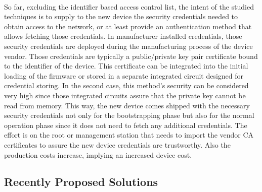\paragraph{}
So far, excluding the identifier based access control list, the intent of the studied techniques is to supply to the new device the security credentials needed to obtain access to the network, or at least provide an authentication method that allows fetching those credentials. In manufacturer installed credentials, those security credentials are deployed during the manufacturing process of the device vendor. Those credentials are typically a public/private key pair certificate bound to the identifier of the device. This certificate can be integrated into the initial loading of the firmware or stored in a separate integrated circuit designed for credential storing. In the second case, this method's security can be considered very high since those integrated circuits assure that the private key cannot be read from memory. This way, the new device comes shipped with the necessary security credentials not only for the bootstrapping phase but also for the normal operation phase since it does not need to fetch any additional credentials. The effort is on the root or management station that needs to import the vendor \gls{CA} certificates to assure the new device credentials are trustworthy. Also the production costs increase, implying an increased device cost.

\subsection{Recently Proposed Solutions}
